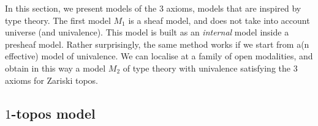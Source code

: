 \newcommand{\inc}{\mathsf{inc}}
\newcommand{\inl}{\mathsf{inl}}
\newcommand{\inr}{\mathsf{inr}}
\newcommand{\idd}{\mathsf{id}}
\newcommand{\II}{\mathbf{I}}
\newcommand\norm[1]{\left\lVert #1 \right\rVert}


\newcommand{\Gm}{\mathsf{G_m}}
\newcommand{\ext}{\mathsf{ext}}
\newcommand{\patch}{\mathsf{patch}}
\newcommand{\cov}{\mathsf{cov}}
\newcommand{\isSheaf}{\mathsf{isSheaf}}
\newcommand{\isIso}{\mathsf{isIso}}
\newcommand{\Fib}{\mathsf{Fib}}

\newcommand{\Typp}{\mathsf{Type}}
\newcommand{\Elem}{\mathsf{Elem}}
\newcommand{\Cont}{\mathsf{Cont}}

\newcommand{\BB}{\mathcal{B}}
\newcommand{\CC}{\mathcal{C}}
\newcommand{\UU}{\mathcal{U}}
\newcommand{\WW}{\mathcal{W}}
\newcommand{\VV}{\mathcal{V}}

In this section, we present models of the 3 axioms, models that are inspired by type theory.
The first model $M_1$ 
is a sheaf model, and does not
take into account universe (and univalence). This model is built
as an {\em internal} model inside a presheaf model. Rather surprisingly, the same method
works if we start from a(n effective) model of univalence. We can localise at a family of open modalities, and  obtain
in this way a model $M_2$ of type theory with univalence satisfying the
3 axioms for Zariski topos.

\subsection{$1$-topos model}

